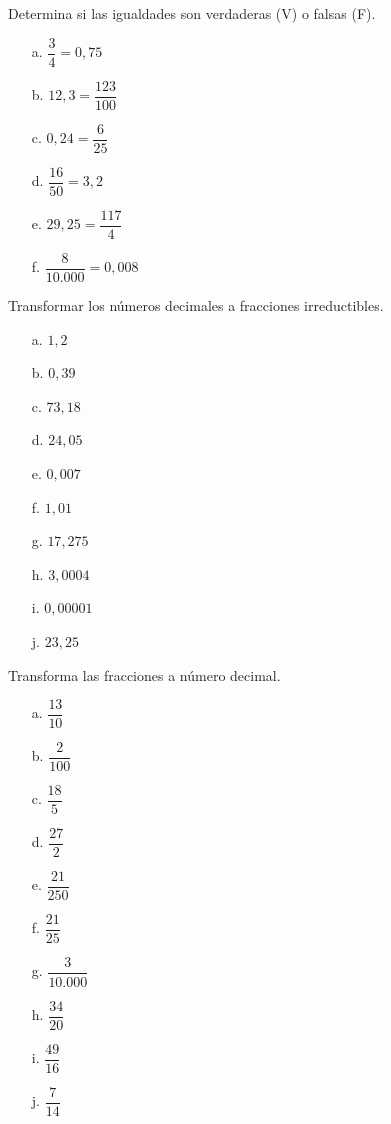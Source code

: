\documentclass[spanish,letterpaper, 11pt, addpoints, answers]{exam}
\begin{document}
\begin{questions}
\question Determina si las igualdades son verdaderas (V) o falsas (F).

\begin{multicols}{2}
  


\begin{itemize}
  \item[a.] $\dfrac{3}{4}=0{,}75$
  \item[b.] $12{,}3=\dfrac{123}{100}$
  \item[c.] $0{,}24=\dfrac{6}{25}$
  \item[d.] $\dfrac{16}{50}=3{,}2$
  \item[e.] $29{,}25=\dfrac{117}{4}$
  \item[f.] $\dfrac{8}{10.000}=0{,}008$         
\end{itemize}

\end{multicols}

\question Transformar los números decimales a fracciones irreductibles.

\begin{multicols}{2}

\begin{itemize}
  \item[a.] $1{,}2$
  \item[b.] $0{,}39$
  \item[c.] $73{,}18$
  \item[d.] $24{,}05$
  \item[e.] $0{,}007$
  \item[f.] $1{,}01$
  \item[g.] $17{,}275$
  \item[h.] $3{,}0004$
  \item[i.] $0{,}00001$
  \item[j.] $23{,}25$
\end{itemize}

\end{multicols}

\question Transforma las fracciones a número decimal.

\begin{multicols}{2}

  \begin{itemize}
    \item[a.] $\dfrac{13}{10}$
    \item[b.] $\dfrac{2}{100}$
    \item[c.] $\dfrac{18}{5}$
    \item[d.] $\dfrac{27}{2}$
    \item[e.] $\dfrac{21}{250}$
    \item[f.] $\dfrac{21}{25}$
    \item[g.] $\dfrac{3}{10.000}$
    \item[h.] $\dfrac{34}{20}$
    \item[i.] $\dfrac{49}{16}$
    \item[j.] $\dfrac{7}{14}$
  \end{itemize}
  

\end{multicols}
\end{questions}
\end{document}
